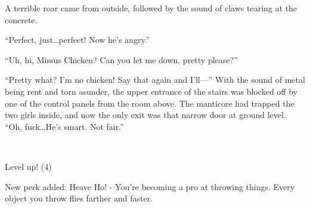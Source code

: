 A terrible roar came from outside, followed by the sound of claws tearing at the concrete.

``Perfect, just\dots perfect! Now he's angry.''

``Uh, hi, Missus Chicken? Can you let me down, pretty please?''

``Pretty what? I'm no chicken! Say that again and I'll---'' With the sound of metal being rent and torn asunder, the upper entrance of the stairs was blocked off by one of the control panels from the room above. The manticore had trapped the two girls inside, and now the only exit was that narrow door at ground level. ``Oh, fuck\dots He's smart. Not fair.''

\clearpage

~\vfill

\begin{engnote}
		Level up! (4)
	
		New perk added: Heave Ho! - You're becoming a pro at throwing things. Every object you throw flies farther and faster.
\end{engnote}


